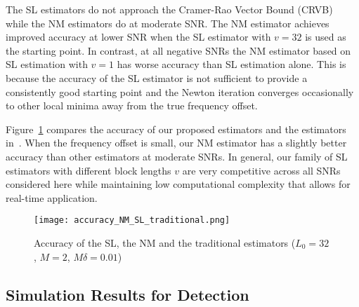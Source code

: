 The SL estimators do not approach the Cramer-Rao Vector Bound (CRVB)~\cite{Gini_98} while the NM
estimators do at moderate SNR. 
The NM estimator achieves improved accuracy at lower SNR
when the SL estimator with $v=32$ is used as the starting point. 
In contrast, at all negative SNRs the NM estimator based on SL estimation with $v=1$ has
worse accuracy than SL estimation alone.
This is because the accuracy of the SL estimator is not sufficient to
provide a consistently good starting point and the Newton iteration converges occasionally to 
other local minima away from the true frequency offset.

Figure~\ref{fig:accuracy_NM_SL_traditional} compares the accuracy of our proposed estimators
and the estimators in~\cite{kay_89,Fitz_94,Luise_Reggiannini_95}.
When the 
frequency offset is small, our NM estimator has a slightly better accuracy than other estimators at moderate SNRs.
In general, our family of  SL estimators with different block lengths $v$
are very competitive across all SNRs considered here while maintaining
low computational complexity that allows for real-time application.

\begin{figure}[t]
    \centerline{\texttt{[image: accuracy\_NM\_SL\_traditional.png]}}
    \caption{Accuracy of the SL, the NM and the traditional estimators ($L_0=32$, $M=2$, $M\delta=0.01$)}
    \label{fig:accuracy_NM_SL_traditional}
    \end{figure}


\subsection{Simulation Results for Detection}




